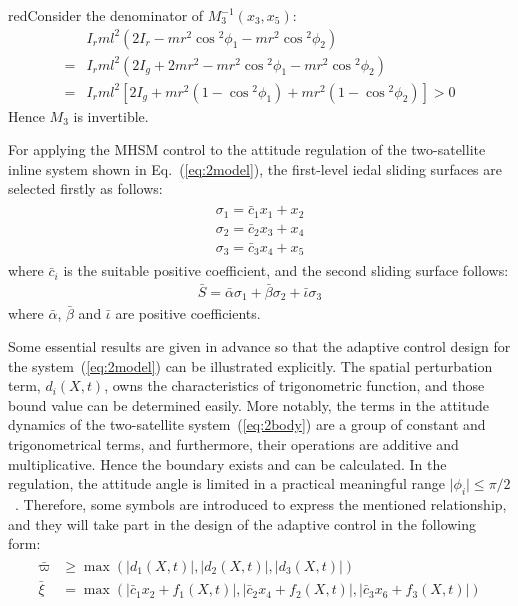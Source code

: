 \begin{color}{red}Consider the denominator of $M_3^{-1}(x_3,x_5)$:
\begin{align*}
&I_rml^2(2I_r-mr^2\cos{^2\phi_1}-mr^2\cos{^2\phi_2})\\
=& I_rml^2(2I_g+2mr^2-mr^2\cos{^2\phi_1}-mr^2\cos{^2\phi_2})\\
=& I_rml^2[2I_g+mr^2(1-\cos{^2\phi_1})+mr^2(1-\cos{^2\phi_2})]>0
\end{align*}
Hence $M_{3}$ is invertible.\end{color}\par
For applying the MHSM control to the attitude regulation of the two-satellite inline system shown in Eq.~(\ref{eq:2model}), the first-level iedal sliding surfaces are selected firstly as follows:
\begin{align}
\begin{split}
\sigma_1 = \bar{c}_1x_1+x_2\\
\sigma_2 = \bar{c}_2x_3+x_4\\
\sigma_3 = \bar{c}_3x_4+x_5
\end{split}\label{eq:sigma123}
\end{align}
where $\bar{c}_i$ is the suitable positive coefficient, and the second sliding surface follows:
\begin{align}
\bar{S} = \bar{\alpha}\sigma_1+ \bar{\beta}\sigma_2+\bar{\iota}\sigma_3\label{eq:bar S}
\end{align}
where $\bar{\alpha}$, $\bar{\beta}$ and $\bar{\iota}$ are positive coefficients.
\begin{remark}
Some essential results are given in advance so that the adaptive control design for the system~(\ref{eq:2model}) can be illustrated explicitly. The spatial perturbation term, $d_i(X,t)$, owns the characteristics of trigonometric function, and those bound value can be determined easily. More notably, the terms in the attitude dynamics of the two-satellite system~(\ref{eq:2body}) are a group of constant and trigonometrical terms, and furthermore, their operations are additive and multiplicative. Hence the boundary exists and can be calculated. In the regulation, the attitude angle is limited in a practical meaningful range $\vert \phi_i\vert\le\pi/2$~\cite{chung2008propellant2}. Therefore, some symbols are introduced to express the mentioned relationship, and they will take part in the design of the adaptive control in the following form:\label{rem:2}
\begin{align}
\begin{split}
\bar\varpi &\ge \max(\vert d_1(X,t)\vert,\vert d_2(X,t)\vert,\vert d_3(X,t)\vert)\\
\bar\xi &=  \max(\vert \bar c_1x_2 + f_1(X,t)\vert,\vert \bar c_2x_4 + f_2(X,t)\vert,\vert \bar c_3x_6 + f_3(X,t)\vert)
\end{split}
\end{align}
\end{remark}\par
